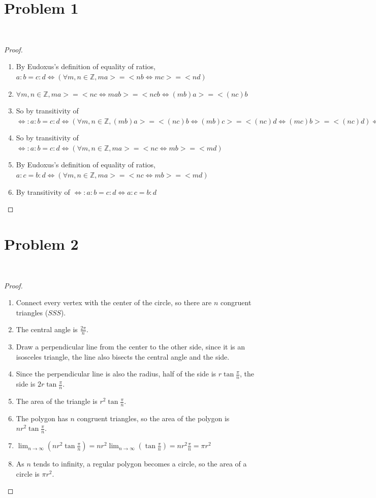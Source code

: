 \documentclass{article}
\begin{document}
\section*{Problem 1}

~

\begin{proof}
~
    \begin{enumerate}
        \item By Eudoxus’s definition of equality of ratios, $a:b=c:d \iff (\forall m,n\in\mathbb{Z}, ma>=<nb\iff mc>=<nd)$
        \item $\forall m,n\in\mathbb{Z}, ma>=<nc\iff mab>=<ncb\iff (mb)a>=<(nc)b$
        \item So by transitivity of $\iff:a:b=c:d \iff (\forall m,n\in\mathbb{Z}, (mb)a>=<(nc)b\iff (mb)c>=<(nc)d \iff (mc)b>=<(nc)d) \iff mb>=<md)$
        \item So by transitivity of $\iff:a:b=c:d \iff (\forall m,n\in\mathbb{Z},ma>=<nc\iff mb>=<md)$
        \item By Eudoxus’s definition of equality of ratios, $a:c=b:d \iff (\forall m,n\in\mathbb{Z},ma>=<nc\iff mb>=<md)$
        \item By transitivity of $\iff:a:b=c:d \iff a:c=b:d$
    \end{enumerate}
\end{proof}

\newpage

\section*{Problem 2}

~

\begin{proof}
    ~
    \begin{enumerate}
        \item Connect every vertex with the center of the circle, so there are $n$ congruent triangles ($SSS$). 
        \item The central angle is $\frac{2\pi}{n}$.
        \item Draw a perpendicular line from the center to the other side, since it is an isosceles triangle, the line also bisects the central angle and the side.
        \item Since the perpendicular line is also the radius, half of the side is $r\tan\frac{\pi}{n}$, the side is $2r\tan\frac{\pi}{n}$.
        \item The area of the triangle is $r^2\tan\frac{\pi}{n}$.
        \item The polygon has $n$ congruent triangles, so the area of the polygon is $nr^2\tan\frac{\pi}{n}$.
        \item $\lim_{n\to\infty}(nr^2\tan\frac{\pi}{n})=nr^2\lim_{n\to\infty}(\tan\frac{\pi}{n})=nr^2\frac{\pi}{n}=\pi r^2$
        \item As $n$ tends to infinity, a regular polygon becomes a circle, so the area of a circle is $\pi r^2$.
    \end{enumerate}
\end{proof}
\end{document}
